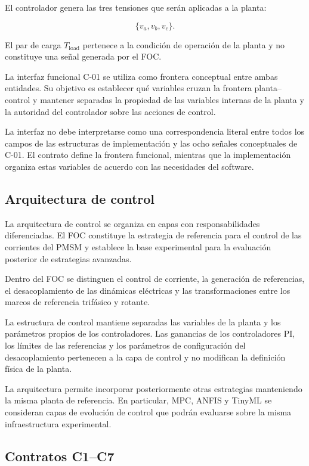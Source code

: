 El controlador genera las tres tensiones que serán aplicadas a la planta:

\begin{equation}
\{v_a,v_b,v_c\}.
\end{equation}

El par de carga $T_{\mathrm{load}}$ pertenece a la condición de operación de la planta y no constituye una señal generada por el FOC.

La interfaz funcional C-01 se utiliza como frontera conceptual entre ambas entidades. Su objetivo es establecer qué variables cruzan la frontera planta--control y mantener separadas la propiedad de las variables internas de la planta y la autoridad del controlador sobre las acciones de control.

La interfaz no debe interpretarse como una correspondencia literal entre todos los campos de las estructuras de implementación y las ocho señales conceptuales de C-01. El contrato define la frontera funcional, mientras que la implementación organiza estas variables de acuerdo con las necesidades del software.

\subsection{Arquitectura de control}

La arquitectura de control se organiza en capas con responsabilidades diferenciadas. El FOC constituye la estrategia de referencia para el control de las corrientes del PMSM y establece la base experimental para la evaluación posterior de estrategias avanzadas.

Dentro del FOC se distinguen el control de corriente, la generación de referencias, el desacoplamiento de las dinámicas eléctricas y las transformaciones entre los marcos de referencia trifásico y rotante.

La estructura de control mantiene separadas las variables de la planta y los parámetros propios de los controladores. Las ganancias de los controladores PI, los límites de las referencias y los parámetros de configuración del desacoplamiento pertenecen a la capa de control y no modifican la definición física de la planta.

La arquitectura permite incorporar posteriormente otras estrategias manteniendo la misma planta de referencia. En particular, MPC, ANFIS y TinyML se consideran capas de evolución de control que podrán evaluarse sobre la misma infraestructura experimental.

\subsection{Contratos C1--C7}


